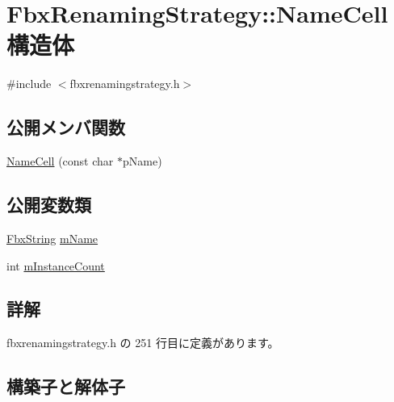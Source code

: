 \hypertarget{struct_fbx_renaming_strategy_1_1_name_cell}{}\section{Fbx\+Renaming\+Strategy\+:\+:Name\+Cell 構造体}
\label{struct_fbx_renaming_strategy_1_1_name_cell}


{\ttfamily \#include $<$fbxrenamingstrategy.\+h$>$}

\subsection*{公開メンバ関数}
\begin{DoxyCompactItemize}
\item 
\hyperlink{struct_fbx_renaming_strategy_1_1_name_cell_a22965f5005aae1a3ea2dcd177ae51bab}{Name\+Cell} (const char $\ast$p\+Name)
\end{DoxyCompactItemize}
\subsection*{公開変数類}
\begin{DoxyCompactItemize}
\item 
\hyperlink{class_fbx_string}{Fbx\+String} \hyperlink{struct_fbx_renaming_strategy_1_1_name_cell_a42d722092fdfc81312ef6f0199794580}{m\+Name}
\item 
int \hyperlink{struct_fbx_renaming_strategy_1_1_name_cell_a2088a0ee75680e2e817f9b782c258e78}{m\+Instance\+Count}
\end{DoxyCompactItemize}


\subsection{詳解}


 fbxrenamingstrategy.\+h の 251 行目に定義があります。



\subsection{構築子と解体子}
\mbox{\label{struct_fbx_renaming_strategy_1_1_name_cell_a22965f5005aae1a3ea2dcd177ae51bab}} 
